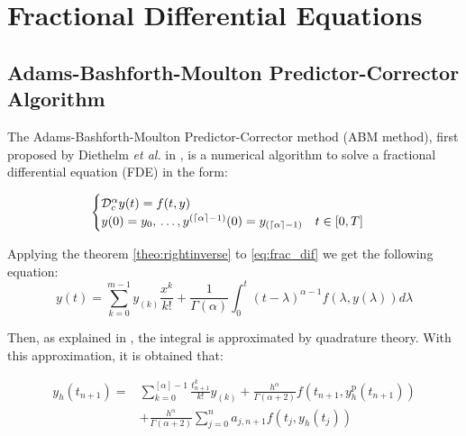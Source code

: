 \section{Fractional Differential Equations}

\subsection{Adams-Bashforth-Moulton Predictor-Corrector Algorithm}\label{sec:ABM}
The Adams-Bashforth-Moulton Predictor-Corrector method (ABM method), first proposed by Diethelm \textit{et al.} in \cite{diethelm2002predictor}, is a numerical algorithm to solve a fractional differential equation (FDE) in the form:

\begin{equation}\label{eq:frac_dif}
\begin{cases}
     \mathcal { D } _ { c } ^ { \alpha }y(t) = f(t,y)&\\ y(0)=y_0,\,\dots,y^{(\lceil\alpha\rceil - 1)}(0)= y_{(\lceil\alpha\rceil - 1)}\quad t\in[0,T]&
\end{cases}
\end{equation}

Applying the theorem \ref{theo:rightinverse} to \ref{eq:frac_dif} we get the following equation:
\begin{equation*}
    y(t)=\sum _{ k=0 }^{ m-1 }{ { y }_{ (k) }\frac { { x }^{ k } }{ k! }  } +\frac { 1 }{ \Gamma (\alpha ) } \int _{ 0 }^{ t }{ { (t-\lambda ) }^{ \alpha -1 }f(\lambda ,y(\lambda ))d\lambda  } 
\end{equation*}

Then, as explained in \cite{diethelm2002predictor}, the integral is approximated by quadrature theory. With this approximation, it is obtained that:

\begin{equation}
    \begin{aligned} y _ { h } \left( t _ { n + 1 } \right) = & \sum _ { k = 0 } ^ { [ \alpha ] - 1 } \frac { t _ { n + 1 } ^ { k } } { k ! } y _ { ( k ) } + \frac { h ^ { \alpha } } { \Gamma ( \alpha + 2 ) } f \left( t _ { n + 1 } , y _ { h } ^ { \mathrm { p } } \left( t _ { n + 1 } \right) \right) \\ & + \frac { h ^ { \alpha } } { \Gamma ( \alpha + 2 ) } \sum _ { j = 0 } ^ { n } a _ { j , n + 1 } f \left( t _ { j } , y _ { h } \left( t _ { j } \right) \right) \end{aligned}
\end{equation}

